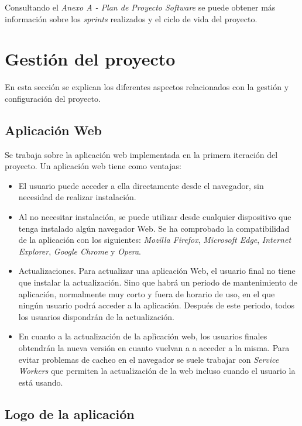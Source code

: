 Consultando el \textit{Anexo A - Plan de Proyecto Software} se puede obtener más información sobre los \textit{sprints} realizados y el ciclo de vida del proyecto.

\section{Gestión del proyecto}

En esta sección se explican los diferentes aspectos relacionados con la gestión y configuración del proyecto.

\subsection{Aplicación Web}

Se trabaja sobre la aplicación web implementada en la primera iteración del proyecto\cite{TFGPrevio}.
Un aplicación web tiene como ventajas: 
\begin{itemize}
	\tightlist
	\item El usuario puede acceder a ella directamente desde el navegador, sin necesidad de realizar instalación.
	\item  Al no necesitar instalación, se puede utilizar desde cualquier dispositivo que tenga instalado algún navegador Web. Se ha comprobado la compatibilidad de la aplicación con los siguientes: \textit{Mozilla Firefox}, \textit{Microsoft Edge}, \textit{Internet Explorer}, \textit{Google Chrome} y \textit{Opera}.
	\item Actualizaciones. Para actualizar una aplicación Web, el usuario final no tiene que instalar la actualización. Sino que habrá un periodo de mantenimiento de aplicación, normalmente muy corto y fuera de horario de uso, en el que ningún usuario podrá acceder a la aplicación. Después de este periodo, todos los usuarios dispondrán de la actualización.
	\item En cuanto a la actualización de la aplìcación web, los usuarios finales obtendrán la nueva versión en cuanto vuelvan a a acceder a la misma. Para evitar problemas de cacheo en el navegador se suele trabajar con \textit{Service Workers} que permiten la actualización de la web incluso cuando el usuario la está usando.
\end{itemize}


\subsection{Logo de la aplicación}

